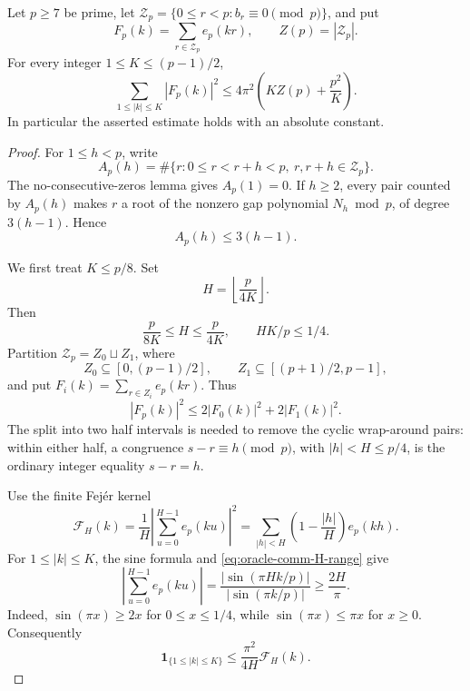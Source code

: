 
\begin{lemma}
\label{lem:oracle-comm-fourier-nonconcentration}
Let \(p\ge 7\) be prime, let
\(\mathcal Z_p=\{0\le r<p:b_r\equiv0\pmod p\}\), and put
\[
 F_p(k)=\sum_{r\in\mathcal Z_p}e_p(kr),
 \qquad Z(p)=|\mathcal Z_p|.
\]
For every integer \(1\le K\le(p-1)/2\),
\[
 \sum_{1\le |k|\le K}|F_p(k)|^2
 \le 4\pi^2\left(KZ(p)+\frac{p^2}{K}\right).
\]
In particular the asserted estimate holds with an absolute constant.
\end{lemma}

\begin{proof}
For \(1\le h<p\), write
\[
 A_p(h)=\#\{r:0\le r<r+h<p,\ r,r+h\in\mathcal Z_p\}.
\]
The no-consecutive-zeros lemma gives \(A_p(1)=0\). If \(h\ge2\),
every pair counted by \(A_p(h)\) makes \(r\) a root of the nonzero gap
polynomial \(N_h\bmod p\), of degree \(3(h-1)\). Hence
\begin{equation}
 A_p(h)\le3(h-1).
 \label{eq:oracle-comm-gap-count}
\end{equation}

We first treat \(K\le p/8\). Set
\[
 H=\left\lfloor\frac{p}{4K}\right\rfloor.
\]
Then
\begin{equation}
 \frac{p}{8K}\le H\le\frac{p}{4K},
 \qquad HK/p\le1/4.
 \label{eq:oracle-comm-H-range}
\end{equation}
Partition \(\mathcal Z_p=Z_0\sqcup Z_1\), where
\[
 Z_0\subseteq[0,(p-1)/2],\qquad
 Z_1\subseteq[(p+1)/2,p-1],
\]
and put \(F_i(k)=\sum_{r\in Z_i}e_p(kr)\). Thus
\begin{equation}
 |F_p(k)|^2\le2|F_0(k)|^2+2|F_1(k)|^2.
 \label{eq:oracle-comm-half-cauchy}
\end{equation}
The split into two half intervals is needed to remove the cyclic
wrap-around pairs: within either half, a congruence
\(s-r\equiv h\pmod p\), with \(|h|<H\le p/4\), is the ordinary
integer equality \(s-r=h\).

Use the finite Fej\'er kernel
\[
 \mathcal F_H(k)
 =\frac1H\left|\sum_{u=0}^{H-1}e_p(ku)\right|^2
 =\sum_{|h|<H}\left(1-\frac{|h|}{H}\right)e_p(kh).
\]
For \(1\le |k|\le K\), the sine formula and
\eqref{eq:oracle-comm-H-range} give
\[
 \left|\sum_{u=0}^{H-1}e_p(ku)\right|
 =\frac{|\sin(\pi Hk/p)|}{|\sin(\pi k/p)|}
 \ge\frac{2H}{\pi}.
\]
Indeed, \(\sin(\pi x)\ge2x\) for \(0\le x\le1/4\), while
\(\sin(\pi x)\le\pi x\) for \(x\ge0\). Consequently
\begin{equation}
 \mathbf1_{\{1\le|k|\le K\}}
 \le\frac{\pi^2}{4H}\mathcal F_H(k).
 \label{eq:oracle-comm-fejer-majorant}
\end{equation}


\end{proof}
